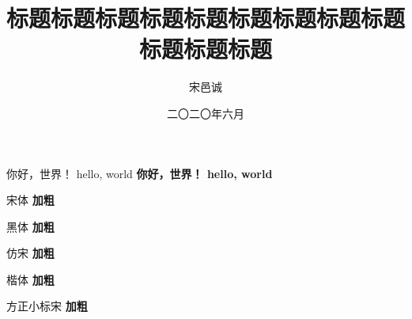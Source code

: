 \documentclass[a4paper, 12pt, double]{HBUThesis}
\date{二〇二〇年六月}
\title{标题标题标题标题标题标题标题标题标题标题标题标题}
\author{宋邑诚}
\begin{document}
\makecover
\makeEncover
\orgState

你好，世界！
hello, world
\textbf{
  你好，世界！
  hello, world
}

\songti 宋体 \textbf{加粗}

\heiti 黑体 \textbf{加粗}

\fangsong 仿宋 \textbf{加粗}

\kaiti 楷体 \textbf{加粗}

\FZXBSong 方正小标宋 \textbf{加粗}
\end{document}
